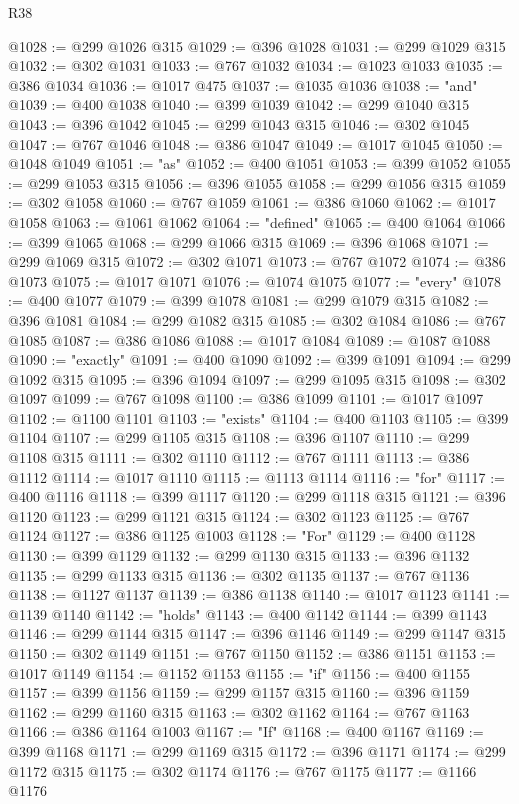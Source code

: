 \begin{lexlean}{R38}
\begin{coremodule}
@1028 := @299 @1026 @315
@1029 := @396 @1028
@1031 := @299 @1029 @315
@1032 := @302 @1031
@1033 := @767 @1032
@1034 := @1023 @1033
@1035 := @386 @1034
@1036 := @1017 @475
@1037 := @1035 @1036
@1038 := "and"
@1039 := @400 @1038
@1040 := @399 @1039
@1042 := @299 @1040 @315
@1043 := @396 @1042
@1045 := @299 @1043 @315
@1046 := @302 @1045
@1047 := @767 @1046
@1048 := @386 @1047
@1049 := @1017 @1045
@1050 := @1048 @1049
@1051 := "as"
@1052 := @400 @1051
@1053 := @399 @1052
@1055 := @299 @1053 @315
@1056 := @396 @1055
@1058 := @299 @1056 @315
@1059 := @302 @1058
@1060 := @767 @1059
@1061 := @386 @1060
@1062 := @1017 @1058
@1063 := @1061 @1062
@1064 := "defined"
@1065 := @400 @1064
@1066 := @399 @1065
@1068 := @299 @1066 @315
@1069 := @396 @1068
@1071 := @299 @1069 @315
@1072 := @302 @1071
@1073 := @767 @1072
@1074 := @386 @1073
@1075 := @1017 @1071
@1076 := @1074 @1075
@1077 := "every"
@1078 := @400 @1077
@1079 := @399 @1078
@1081 := @299 @1079 @315
@1082 := @396 @1081
@1084 := @299 @1082 @315
@1085 := @302 @1084
@1086 := @767 @1085
@1087 := @386 @1086
@1088 := @1017 @1084
@1089 := @1087 @1088
@1090 := "exactly"
@1091 := @400 @1090
@1092 := @399 @1091
@1094 := @299 @1092 @315
@1095 := @396 @1094
@1097 := @299 @1095 @315
@1098 := @302 @1097
@1099 := @767 @1098
@1100 := @386 @1099
@1101 := @1017 @1097
@1102 := @1100 @1101
@1103 := "exists"
@1104 := @400 @1103
@1105 := @399 @1104
@1107 := @299 @1105 @315
@1108 := @396 @1107
@1110 := @299 @1108 @315
@1111 := @302 @1110
@1112 := @767 @1111
@1113 := @386 @1112
@1114 := @1017 @1110
@1115 := @1113 @1114
@1116 := "for"
@1117 := @400 @1116
@1118 := @399 @1117
@1120 := @299 @1118 @315
@1121 := @396 @1120
@1123 := @299 @1121 @315
@1124 := @302 @1123
@1125 := @767 @1124
@1127 := @386 @1125 @1003
@1128 := "For"
@1129 := @400 @1128
@1130 := @399 @1129
@1132 := @299 @1130 @315
@1133 := @396 @1132
@1135 := @299 @1133 @315
@1136 := @302 @1135
@1137 := @767 @1136
@1138 := @1127 @1137
@1139 := @386 @1138
@1140 := @1017 @1123
@1141 := @1139 @1140
@1142 := "holds"
@1143 := @400 @1142
@1144 := @399 @1143
@1146 := @299 @1144 @315
@1147 := @396 @1146
@1149 := @299 @1147 @315
@1150 := @302 @1149
@1151 := @767 @1150
@1152 := @386 @1151
@1153 := @1017 @1149
@1154 := @1152 @1153
@1155 := "if"
@1156 := @400 @1155
@1157 := @399 @1156
@1159 := @299 @1157 @315
@1160 := @396 @1159
@1162 := @299 @1160 @315
@1163 := @302 @1162
@1164 := @767 @1163
@1166 := @386 @1164 @1003
@1167 := "If"
@1168 := @400 @1167
@1169 := @399 @1168
@1171 := @299 @1169 @315
@1172 := @396 @1171
@1174 := @299 @1172 @315
@1175 := @302 @1174
@1176 := @767 @1175
@1177 := @1166 @1176

\end{coremodule}
\end{lexlean}
